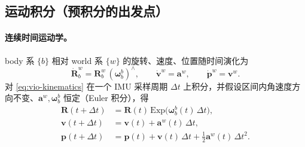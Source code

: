 \subsection{运动积分（预积分的出发点）}
\label{sec:vio-motion-int}

\paragraph{连续时间运动学。}
body 系 $\{b\}$ 相对 world 系 $\{w\}$ 的旋转、速度、位置随时间演化为\cite{carlone2026handbook}
\begin{equation}
  \dot{\mathbf{R}}^w_b=\mathbf{R}^w_b\,(\boldsymbol{\omega}^b_b)^\wedge,\qquad
  \dot{\mathbf{v}}^w=\mathbf{a}^w,\qquad
  \dot{\mathbf{p}}^w=\mathbf{v}^w.
  \label{eq:vio-kinematics}
\end{equation}
对 \cref{eq:vio-kinematics} 在一个 IMU 采样周期 $\Delta t$ 上积分，并假设区间内角速度方向不变、$\mathbf{a}^w,\boldsymbol{\omega}^b_b$ 恒定（Euler 积分），得
\begin{equation}
\begin{aligned}
  \mathbf{R}(t+\Delta t)&=\mathbf{R}(t)\,\mathrm{Exp}\!\big(\boldsymbol{\omega}^b_b(t)\,\Delta t\big),\\
  \mathbf{v}(t+\Delta t)&=\mathbf{v}(t)+\mathbf{a}^w(t)\,\Delta t,\\
  \mathbf{p}(t+\Delta t)&=\mathbf{p}(t)+\mathbf{v}(t)\,\Delta t+\tfrac12\mathbf{a}^w(t)\,\Delta t^2.
\end{aligned}
  \label{eq:vio-euler}
\end{equation}

